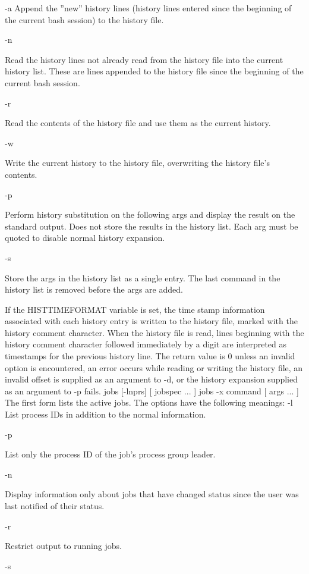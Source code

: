 {-a
Append the ''new'' history lines (history lines entered since the beginning of the current bash session) to the history file.

-n

Read the history lines not already read from the history file into the current history list. These are lines appended to the history file since the beginning of the current bash session.

-r

Read the contents of the history file and use them as the current history.

-w

Write the current history to the history file, overwriting the history file's contents.

-p

Perform history substitution on the following args and display the result on the standard output. Does not store the results in the history list. Each arg must be quoted to disable normal history expansion.

-s

Store the args in the history list as a single entry. The last command in the history list is removed before the args are added.

If the HISTTIMEFORMAT variable is set, the time stamp information associated with each history entry is written to the history file, marked with the history comment character. When the history file is read, lines beginning with the history comment character followed immediately by a digit are interpreted as timestamps for the previous history line. The return value is 0 unless an invalid option is encountered, an error occurs while reading or writing the history file, an invalid offset is supplied as an argument to -d, or the history expansion supplied as an argument to -p fails.
jobs [-lnprs] [ jobspec ... ]
jobs -x command [ args ... ]
The first form lists the active jobs. The options have the following meanings:
-l
List process IDs in addition to the normal information.

-p

List only the process ID of the job's process group leader.

-n

Display information only about jobs that have changed status since the user was last notified of their status.

-r

Restrict output to running jobs.

-s

}
